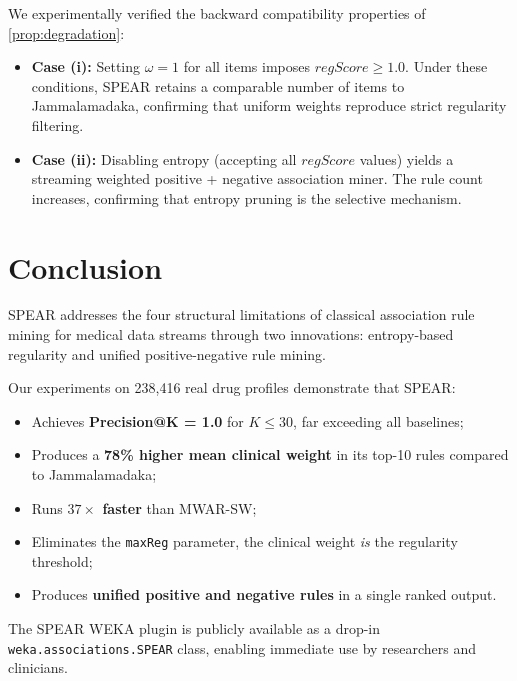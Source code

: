 \documentclass[10pt,twocolumn]{article}
\theoremstyle{plain}
\theoremstyle{definition}
\theoremstyle{remark}
\newcommand{\regscore}{\mathit{regScore}}
\begin{document}
We experimentally verified the backward compatibility properties
of \cref{prop:degradation}:

\begin{itemize}[leftmargin=*]
  \item \textbf{Case (i):} Setting $\omega = 1$ for all items imposes
        $\regscore \geq 1.0$.
        Under these conditions, SPEAR retains a comparable number of
        items to Jammalamadaka, confirming that uniform weights
        reproduce strict regularity filtering.

  \item \textbf{Case (ii):} Disabling entropy (accepting all
        $\regscore$ values) yields a streaming weighted positive +
        negative association miner.
        The rule count increases, confirming that entropy pruning is
        the selective mechanism.
\end{itemize}

\section{Conclusion}
\label{sec:conclusion}

SPEAR addresses the four structural limitations of classical
association rule mining for medical data streams through two
innovations: entropy-based regularity and unified
positive-negative rule mining.

Our experiments on 238{,}416 real drug profiles demonstrate that
SPEAR:
\begin{itemize}[leftmargin=*]
  \item Achieves \textbf{Precision@K = 1.0} for $K \leq 30$,
        far exceeding all baselines;
  \item Produces a \textbf{78\% higher mean clinical weight} in its
        top-10 rules compared to Jammalamadaka;
  \item Runs \textbf{$37\times$ faster} than MWAR-SW;
  \item Eliminates the \texttt{maxReg} parameter, the clinical
        weight \emph{is} the regularity threshold;
  \item Produces \textbf{unified positive and negative rules} in a
        single ranked output.
\end{itemize}

The SPEAR WEKA plugin is publicly available as a drop-in
\texttt{weka.associations.SPEAR} class, enabling immediate
use by researchers and clinicians.
\end{document}
